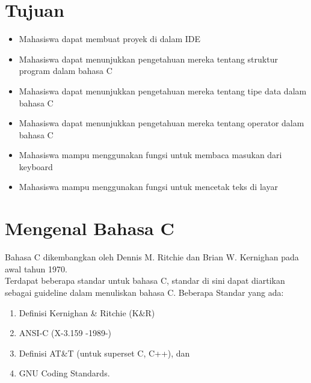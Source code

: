 \section{Tujuan}
\begin{itemize}[label=$\bullet$, itemsep=-1pt, leftmargin=*]
	\item Mahasiswa dapat membuat proyek di dalam IDE
	\item Mahasiswa dapat menunjukkan pengetahuan mereka tentang struktur program dalam bahasa C
	\item Mahasiswa dapat menunjukkan pengetahuan mereka tentang tipe data dalam bahasa C
	\item Mahasiswa dapat menunjukkan pengetahuan mereka tentang operator dalam bahasa C
	\item Mahasiswa mampu menggunakan fungsi untuk membaca masukan dari keyboard
	\item Mahasiswa mampu menggunakan fungsi untuk mencetak teks di layar

\end{itemize}
\section{Mengenal Bahasa C}

Bahasa C dikembangkan oleh Dennis M. Ritchie dan Brian W. Kernighan pada awal tahun 1970.\\
Terdapat beberapa standar untuk bahasa C, standar di sini dapat diartikan sebagai guideline dalam menuliskan bahasa C. Beberapa Standar yang ada:
\begin{enumerate}
	\item  Definisi Kernighan \& Ritchie (K\&R)
	\item ANSI-C (X-3.159 -1989-)
	\item Definisi AT\&T (untuk superset C, C++), dan
	\item GNU Coding Standards.
\end{enumerate}
